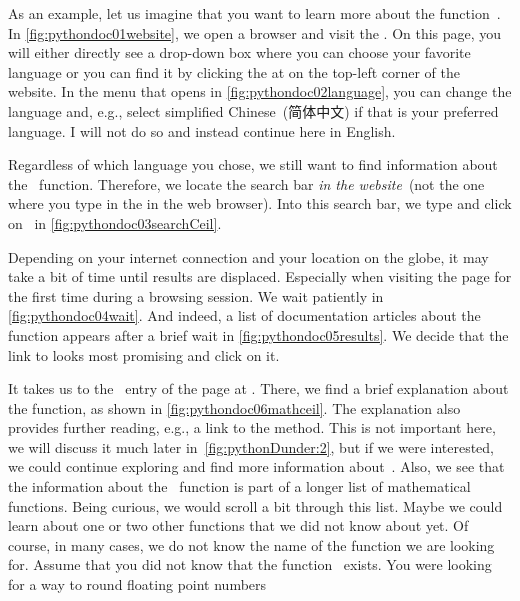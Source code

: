 As an example, let us imagine that you want to learn more about the function~.
In \cref{fig:pythondoc01website}, we open a browser and visit the .
On this page, you will either directly see a drop-down box where you can choose your favorite language or you can find it by clicking the \menu{\threeBarButton} at on the top-left corner of the website.
In the menu that opens in \cref{fig:pythondoc02language}, you can change the language and, e.g., select simplified Chinese~(简体中文) if that is your preferred language.
I will not do so and instead continue here in English.

Regardless of which language you chose, we still want to find information about the ~function.
Therefore, we locate the search bar \emph{in the website}~(not the one where you type in the  in the web browser).
Into this search bar, we type  and click on~ in \cref{fig:pythondoc03searchCeil}.

Depending on your internet connection and your location on the globe, it may take a bit of time until results are displaced.
Especially when visiting the page for the first time during a browsing session.
We wait patiently in \cref{fig:pythondoc04wait}.
And indeed, a list of documentation articles about the  function appears after a brief wait in \cref{fig:pythondoc05results}.
We decide that the link to  looks most promising and click on it.

It takes us to the ~entry of the  page at .
There, we find a brief explanation about the  function, as shown in \cref{fig:pythondoc06mathceil}.
The explanation also provides further reading, e.g., a link to the  method.
This is not important here, we will discuss it much later in~\cref{fig:pythonDunder:2}, but if we were interested, we could continue exploring and find more information about~.
Also, we see that the information about the ~function is part of a longer list of mathematical functions.
Being curious, we would scroll a bit through this list.
Maybe we could learn about one or two other functions that we did not know about yet.%
%
%
%
Of course, in many cases, we do not know the name of the function we are looking for.
Assume that you did not know that the function~ exists.
You were looking for a way to round floating point numbers 

